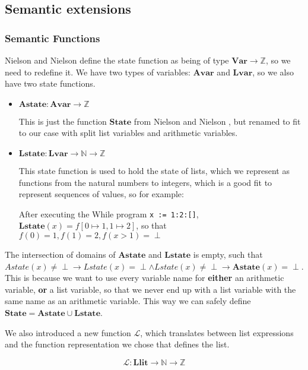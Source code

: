 \documentclass[12pt]{article}
\newcommand\mono\texttt
\newcommand{\LL}{\mathcal{L}}
\newcommand{\Var}{\mathbf{Var}}
\newcommand{\Avar}{\mathbf{Avar}}
\newcommand{\Lvar}{\mathbf{Lvar}}
\newcommand{\Astate}{\mathbf{Astate}}
\newcommand{\Lstate}{\mathbf{Lstate}}
\newcommand{\Llit}{\mathbf{Llit}}
\begin{document}
\subsection{Semantic extensions} %

\subsubsection{Semantic Functions}

Nielson and Nielson define the state function as being of type $\Var \rightarrow \mathbb{Z}$, so we need to redefine it. We have two types of variables: $\Avar$ and $\Lvar$, so we also have two state functions.

\begin{itemize}
    \item $\Astate: \Avar \rightarrow \mathbb{Z}$

    This is just the function $\mathbf{State}$ from Nielson and Nielson \cite{wiley}, but renamed to fit to our case with split list variables and arithmetic variables.
    \item $\Lstate: \Lvar \rightarrow \mathbb{N} \rightarrow \mathbb{Z}$

    This state function is used to hold the state of lists, which we represent as functions from the natural numbers to integers, which is a good fit to represent sequences of values, so for example:

    After executing the While program \mono{x := 1:2:[]}, $\Lstate(x) = f[0 \mapsto 1, 1 \mapsto 2]$, so that $f(0) = 1, f(1) = 2, f(x > 1) = \perp$
\end{itemize}

The intersection of domains of $\Astate$ and $\Lstate$ is empty, such that $Astate(x) \neq \perp \rightarrow Lstate(x) = \perp \land Lstate(x) \neq \perp \rightarrow \Astate(x) = \perp$. This is because we want to use every variable name for \textbf{either} an arithmetic variable, \textbf{or} a list variable, so that we never end up with a list variable with the same name as an arithmetic variable. This way we can safely define $\mathbf{State} = \Astate \cup \Lstate$.

We also introduced a new function $\LL$, which translates between list expressions and the function representation we chose that defines the list.

$$\LL: \Llit \rightarrow \mathbb{N} \rightarrow \mathbb{Z}$$
\end{document}
